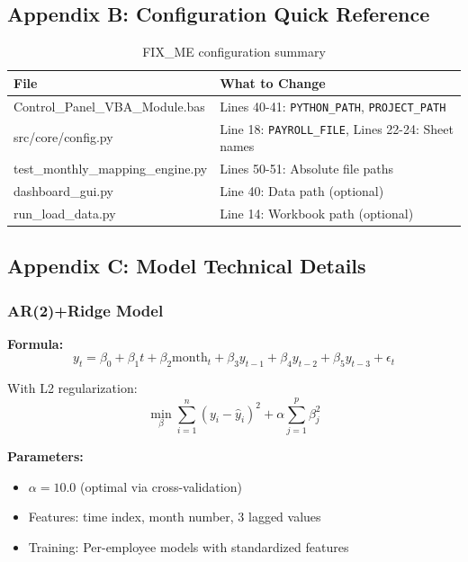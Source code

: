 \documentclass[11pt,a4paper]{article}
\begin{document}
\subsection{Appendix B: Configuration Quick Reference}

\begin{table}[h]
\centering
\small
\begin{tabular}{@{} p{5cm} p{8cm} @{}}
\toprule
\textbf{File} & \textbf{What to Change} \\
\midrule
Control\_Panel\_VBA\_Module.bas & Lines 40-41: \texttt{PYTHON\_PATH}, \texttt{PROJECT\_PATH} \\
src/core/config.py & Line 18: \texttt{PAYROLL\_FILE}, Lines 22-24: Sheet names \\
test\_monthly\_mapping\_engine.py & Lines 50-51: Absolute file paths \\
dashboard\_gui.py & Line 40: Data path (optional) \\
run\_load\_data.py & Line 14: Workbook path (optional) \\
\bottomrule
\end{tabular}
\caption{FIX\_ME configuration summary}
\end{table}

\newpage

\subsection{Appendix C: Model Technical Details}

\subsubsection{AR(2)+Ridge Model}

\textbf{Formula:}
\begin{equation}
y_t = \beta_0 + \beta_1 t + \beta_2 \text{month}_t + \beta_3 y_{t-1} + \beta_4 y_{t-2} + \beta_5 y_{t-3} + \epsilon_t
\end{equation}

With L2 regularization:
\begin{equation}
\min_{\beta} \sum_{i=1}^{n} (y_i - \hat{y}_i)^2 + \alpha \sum_{j=1}^{p} \beta_j^2
\end{equation}

\textbf{Parameters:}
\begin{itemize}[leftmargin=*]
    \item $\alpha = 10.0$ (optimal via cross-validation)
    \item Features: time index, month number, 3 lagged values
    \item Training: Per-employee models with standardized features
\end{itemize}
\end{document}

